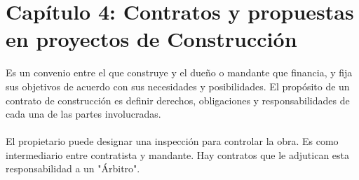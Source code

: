 \part{Capítulo 4: Contratos y propuestas en proyectos de Construcción}

Es un convenio entre el que construye y el dueño o mandante que financia, y fija sus objetivos
de acuerdo con sus necesidades y posibilidades. El propósito de un contrato de construcción
es definir derechos, obligaciones y responsabilidades de cada una de las partes involucradas.
\\ \\
El propietario puede designar una inspección para controlar la obra. Es como intermediario entre
contratista y mandante. Hay contratos que le adjutican esta responsabilidad a un "Árbitro".

